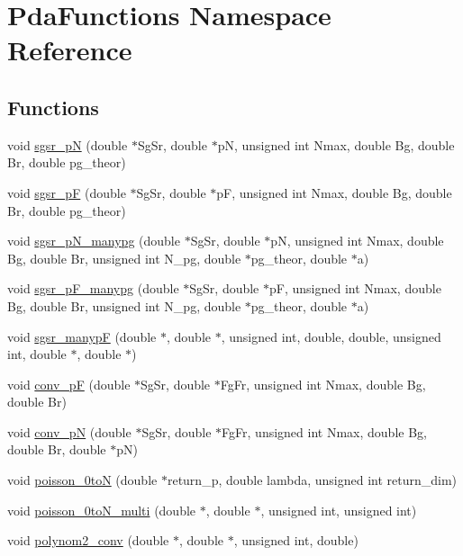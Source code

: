 \hypertarget{namespace_pda_functions}{}\section{Pda\+Functions Namespace Reference}
\label{namespace_pda_functions}
\subsection*{Functions}
\begin{DoxyCompactItemize}
\item 
void \hyperlink{namespace_pda_functions_a050993b2b90ecebe38776340834e0b50}{sgsr\+\_\+pN} (double $\ast$Sg\+Sr, double $\ast$pN, unsigned int Nmax, double Bg, double Br, double pg\+\_\+theor)
\item 
void \hyperlink{namespace_pda_functions_aa77615bc27d7b196fdbe50429ceadb86}{sgsr\+\_\+pF} (double $\ast$Sg\+Sr, double $\ast$pF, unsigned int Nmax, double Bg, double Br, double pg\+\_\+theor)
\item 
void \hyperlink{namespace_pda_functions_a38a72930ebb94ebee941a82cec608447}{sgsr\+\_\+p\+N\+\_\+manypg} (double $\ast$Sg\+Sr, double $\ast$pN, unsigned int Nmax, double Bg, double Br, unsigned int N\+\_\+pg, double $\ast$pg\+\_\+theor, double $\ast$a)
\item 
void \hyperlink{namespace_pda_functions_ac8c00ed27b7bfb24e099f98cfb9e5fba}{sgsr\+\_\+p\+F\+\_\+manypg} (double $\ast$Sg\+Sr, double $\ast$pF, unsigned int Nmax, double Bg, double Br, unsigned int N\+\_\+pg, double $\ast$pg\+\_\+theor, double $\ast$a)
\item 
void \hyperlink{namespace_pda_functions_afc3779dee6ad3e7d4a6f3c929ac0e160}{sgsr\+\_\+manypF} (double $\ast$, double $\ast$, unsigned int, double, double, unsigned int, double $\ast$, double $\ast$)
\item 
void \hyperlink{namespace_pda_functions_aaf576da99282a2a2695d3b216c3ed697}{conv\+\_\+pF} (double $\ast$Sg\+Sr, double $\ast$Fg\+Fr, unsigned int Nmax, double Bg, double Br)
\item 
void \hyperlink{namespace_pda_functions_a595a8233f39ec5db40e35c7de69dc019}{conv\+\_\+pN} (double $\ast$Sg\+Sr, double $\ast$Fg\+Fr, unsigned int Nmax, double Bg, double Br, double $\ast$pN)
\item 
void \hyperlink{namespace_pda_functions_ac9409faa9ab0ab98c2a659bcd5fa3071}{poisson\+\_\+0toN} (double $\ast$return\+\_\+p, double lambda, unsigned int return\+\_\+dim)
\item 
void \hyperlink{namespace_pda_functions_ab0ca4731a72ebdcd2253c60f2de5747e}{poisson\+\_\+0to\+N\+\_\+multi} (double $\ast$, double $\ast$, unsigned int, unsigned int)
\item 
void \hyperlink{namespace_pda_functions_a91097b4e0e8dc8a283430fc3ad3c9acf}{polynom2\+\_\+conv} (double $\ast$, double $\ast$, unsigned int, double)
\end{DoxyCompactItemize}


